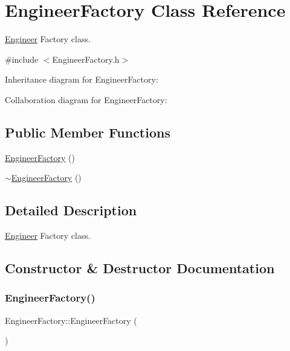 \hypertarget{classEngineerFactory}{}\section{Engineer\+Factory Class Reference}
\label{classEngineerFactory}


\hyperlink{classEngineer}{Engineer} Factory class.  




{\ttfamily \#include $<$Engineer\+Factory.\+h$>$}



Inheritance diagram for Engineer\+Factory\+:


Collaboration diagram for Engineer\+Factory\+:
\subsection*{Public Member Functions}
\begin{DoxyCompactItemize}
\item 
\hyperlink{classEngineerFactory_a71b5abb3e85ebe5f78eaafc388d0ed2d}{Engineer\+Factory} ()
\item 
\hyperlink{classEngineerFactory_af892e0d4b047414dbcefee0bbe943208}{$\sim$\+Engineer\+Factory} ()
\end{DoxyCompactItemize}


\subsection{Detailed Description}
\hyperlink{classEngineer}{Engineer} Factory class. 

\subsection{Constructor \& Destructor Documentation}
\mbox{\label{classEngineerFactory_a71b5abb3e85ebe5f78eaafc388d0ed2d}} 
\subsubsection{\texorpdfstring{Engineer\+Factory()}{EngineerFactory()}}
{\footnotesize\ttfamily Engineer\+Factory\+::\+Engineer\+Factory (\begin{DoxyParamCaption}{ }\end{DoxyParamCaption})}

